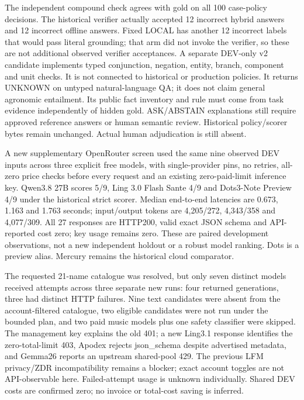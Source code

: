 \documentclass[10pt,a4paper,twocolumn]{article}
\begin{document}
The independent compound check agrees with gold on all 100 case-policy decisions. The historical verifier actually accepted 12 incorrect hybrid answers and 12 incorrect offline answers. Fixed LOCAL has another 12 incorrect labels that would pass literal grounding; that arm did not invoke the verifier, so these are not additional observed verifier acceptances. A separate DEV-only v2 candidate implements typed conjunction, negation, entity, branch, component and unit checks. It is not connected to historical or production policies. It returns UNKNOWN on untyped natural-language QA; it does not claim general agronomic entailment. Its public fact inventory and rule must come from task evidence independently of hidden gold. ASK/ABSTAIN explanations still require approved reference answers or human semantic review. Historical policy/scorer bytes remain unchanged. Actual human adjudication is still absent.

A new supplementary OpenRouter screen used the same nine observed DEV inputs across three explicit free models, with single-provider pins, no retries, all-zero price checks before every request and an existing zero-paid-limit inference key. Qwen3.8 27B scores 5/9, Ling 3.0 Flash Sante 4/9 and Dots3-Note Preview 4/9 under the historical strict scorer. Median end-to-end latencies are 0.673, 1.163 and 1.763 seconds; input/output tokens are 4,205/272, 4,343/358 and 4,077/309. All 27 responses are HTTP200, valid exact JSON schema and API-reported cost zero; key usage remains zero. These are paired development observations, not a new independent holdout or a robust model ranking. Dots is a preview alias. Mercury remains the historical cloud comparator.

The requested 21-name catalogue was resolved, but only seven distinct models received attempts across three separate new runs: four returned generations, three had distinct HTTP failures. Nine text candidates were absent from the account-filtered catalogue, two eligible candidates were not run under the bounded plan, and two paid music models plus one safety classifier were skipped. The management key explains the old 401; a new Ling3.1 response identifies the zero-total-limit 403, Apodex rejects json\_schema despite advertised metadata, and Gemma26 reports an upstream shared-pool 429. The previous LFM privacy/ZDR incompatibility remains a blocker; exact account toggles are not API-observable here. Failed-attempt usage is unknown individually. Shared DEV costs are confirmed zero; no invoice or total-cost saving is inferred.
\end{document}
